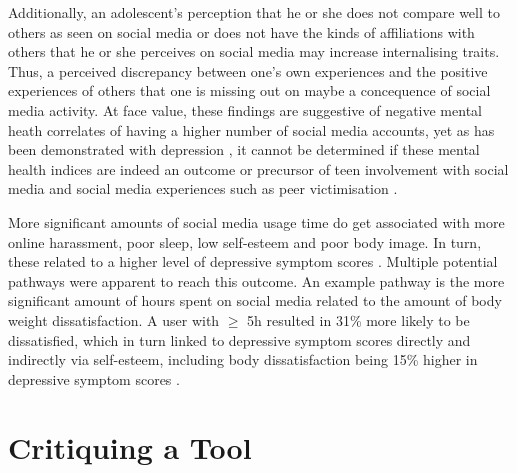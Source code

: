 \documentclass{sigchi}
\begin{document}
	Additionally, an adolescent's perception that he or she does not compare well to others as seen on social media or does not have the kinds of affiliations with others that he or she perceives on social media may increase internalising traits. Thus, a perceived discrepancy between one's own experiences and the positive experiences of others that one is missing out on maybe a concequence of social media activity. At face value, these findings are suggestive of negative mental heath correlates of having a higher number of social media accounts, yet as has been demonstrated with depression \cite{frison2016short}, it cannot be determined if these mental health indices are indeed an outcome or precursor of teen involvement with social media and social media experiences such as peer victimisation \cite{barry2017adolescent}.

	More significant amounts of social media usage time do get associated with more online harassment, poor sleep, low self-esteem and poor body image. In turn, these related to a higher level of depressive symptom scores \cite{kelly2018social}. Multiple potential pathways were apparent to reach this outcome. An example pathway is the more significant amount of hours spent on social media related to the amount of body weight dissatisfaction. A user with $\geq$ 5h resulted in 31\% more likely to be dissatisfied, which in turn linked to depressive symptom scores directly and indirectly via self-esteem, including body dissatisfaction being 15\% higher in depressive symptom scores \cite{kelly2018social}.

\section{Critiquing a Tool}

\end{document}
